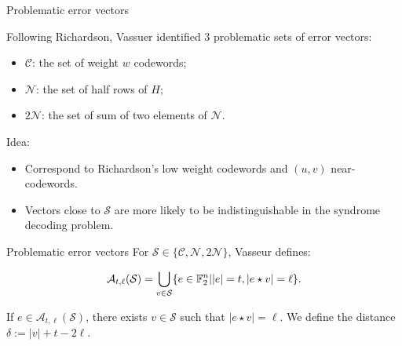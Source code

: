 \begin{frame}{Problematic error vectors}

    Following Richardson, Vassuer identified $3$ problematic sets of error vectors:

    \begin{itemize}
        \item $\mathcal{C}$: the set of weight $w$ codewords;
        \item $\mathcal{N}$: the set of half rows of $H$;
        \item $2\mathcal{N}$: the set of sum of two elements of $\mathcal{N}$.
    \end{itemize}
    
    Idea:
    \begin{itemize}
        \item Correspond to Richardson's low weight codewords and $(u,v)$ near-codewords.
        \item Vectors close to $\mathcal{S}$ are more likely to be indistinguishable in the syndrome decoding problem.
    \end{itemize}

    
\end{frame}

\begin{frame}{Problematic error vectors}
        For $\mathcal{S} \in \{ \mathcal{C},\mathcal{N}, 2\mathcal{N}\}$, Vasseur defines:
    
    \[
    \mathcal{A}_{t,\ell}(\mathcal{S}) = \bigcup_{v \in \mathcal{S}} \{ e \in \mathbb{F}_2^n| |e| = t, |e \star v| = \ell \}.
    \]
    
    If $e \in \mathcal{A}_{t,\ell}(\mathcal{S})$, there exists $v\in \mathcal{S}$ such that $|e \star v| = \ell$. We define the distance $\delta:= |v| + t - 2\ell$.
    
\end{frame}


